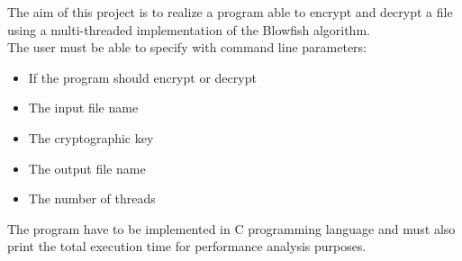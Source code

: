 The aim of this project is to realize a program able to encrypt and decrypt a file using a multi-threaded implementation of the Blowfish algorithm.\\
The user must be able to specify with command line parameters:

\begin{itemize}
 \item If the program should encrypt or decrypt
 \item The input file name
 \item The cryptographic key
 \item The output file name
 \item The number of threads
 \end{itemize}  

The program have to be implemented in C programming language and must also print the total execution time for performance analysis purposes.